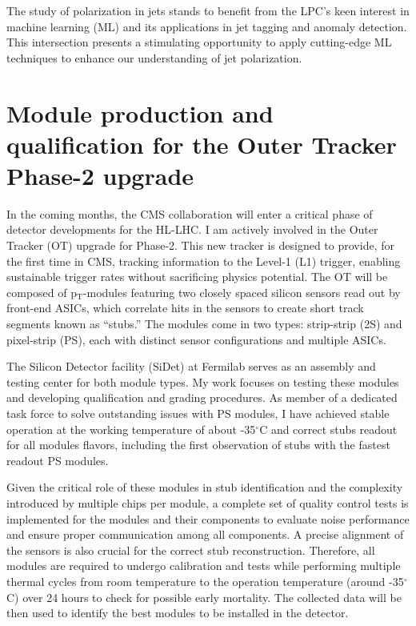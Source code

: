 {\begin{flushleft}
The study of polarization in jets stands to benefit from the LPC's keen interest in machine learning (ML) and its applications in jet tagging and anomaly detection. This intersection presents a stimulating opportunity to apply cutting-edge ML techniques to enhance our understanding of jet polarization.

\vspace{\baselineskip}
\section{Module production and qualification for the Outer Tracker Phase-2 upgrade}
In the coming months, the CMS collaboration will enter a critical phase of detector developments for the HL-LHC.  I am actively involved in the Outer Tracker (OT) upgrade for Phase-2. This new tracker is designed to provide, for the first time in CMS, tracking information to the Level-1 (L1) trigger, enabling sustainable trigger rates without sacrificing physics potential. The OT will be composed of p$_{\mathrm{T}}$-modules featuring two closely spaced silicon sensors read out by front-end ASICs, which correlate hits in the sensors to create short track segments known as ``stubs.'' The modules come in two types: strip-strip (2S) and pixel-strip (PS), each with distinct sensor configurations and multiple ASICs.


The Silicon Detector facility (SiDet) at Fermilab serves as an assembly and testing center for both module types. My work focuses on testing these modules and developing qualification and grading procedures. As member of a dedicated task force to solve outstanding issues with PS modules, I have achieved stable operation at the working temperature of about -35$^{\circ}$C and correct stubs readout for all modules flavors, including the first observation of stubs with the fastest readout PS modules.

Given the critical role of these modules in stub identification and the complexity introduced by multiple chips per module, a complete set of quality control tests is implemented for the modules and their components to evaluate noise performance and ensure proper communication among all components. A precise alignment of the sensors is also crucial for the correct stub reconstruction. Therefore, all modules are required to undergo calibration and tests while performing multiple thermal cycles from room temperature to the operation temperature (around -35$^{\circ}$C) over 24 hours to check for possible early mortality. The collected data will be then used to identify the best modules to be installed in the detector.
 

\end{flushleft}}
